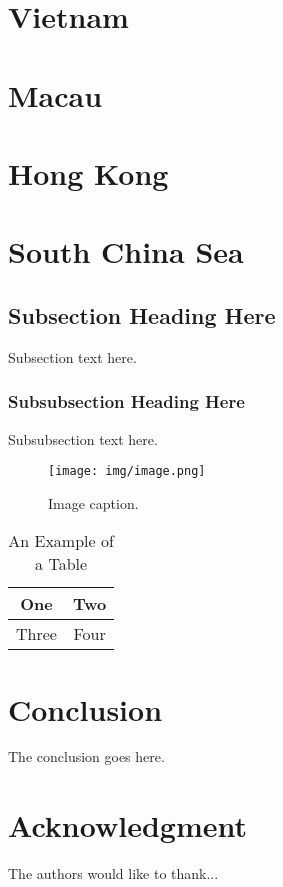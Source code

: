 \documentclass[conference]{IEEEtran}
\begin{document}
	\section{Vietnam}
	
	\section{Macau}
	
	\section{Hong Kong}
	
	\section{South China Sea}
	
	\subsection{Subsection Heading Here}
	Subsection text here. \cite{robo4you}
	
	\subsubsection{Subsubsection Heading Here}
	Subsubsection text here. \cite{Hope_Learning_TensorFlow}
	
	\begin{figure}[t]
		\centering
		\texttt{[image: img/image.png]}
		\caption{Image caption.}
		\label{pic:image}
	\end{figure}

	\begin{table}[!t]
	\renewcommand{\arraystretch}{1.3}
	\caption{An Example of a Table}
	\label{table_example}
	\centering
	\begin{tabular}{|c||c|}
	\hline
	One & Two\\
	\hline
	Three & Four\\
	\hline
	\end{tabular}
	\end{table}
	
	\section{Conclusion}
	The conclusion goes here.
	
	\section*{Acknowledgment}
	The authors would like to thank...
	
	
	
\end{document}
